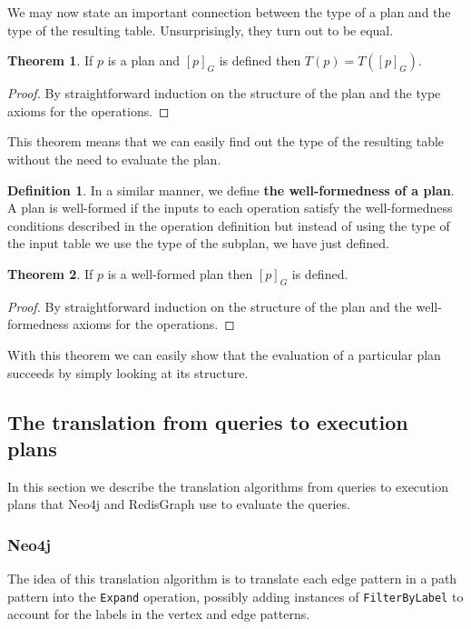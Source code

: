 \documentclass[14pt]{constructor-thesis}
\theoremstyle{definition}
\newtheorem{theorem}{Theorem}
\newtheorem{definition}{Definition}
\begin{document}
We may now state an important connection between the type of a plan and the type of the resulting table. Unsurprisingly, they turn out to be equal.

\begin{theorem}
  If $p$ is a plan and $[p]_G$ is defined then $T(p) = T([p]_G)$.
\end{theorem}
\begin{proof}
  By straightforward induction on the structure of the plan and the type axioms for the operations.
\end{proof}

This theorem means that we can easily find out the type of the resulting table without the need to evaluate the plan.

\begin{definition}
  In a similar manner, we define \textbf{the well-formedness of a plan}. A plan is well-formed if the inputs to each operation satisfy the well-formedness conditions described in the operation definition but instead of using the type of the input table we use the type of the subplan, we have just defined.
\end{definition}

\begin{theorem}
  If $p$ is a well-formed plan then $[p]_G$ is defined.
\end{theorem}
\begin{proof}
  By straightforward induction on the structure of the plan and the well-formedness axioms for the operations.
\end{proof}

With this theorem we can easily show that the evaluation of a particular plan succeeds by simply looking at its structure.

\subsection{The translation from queries to execution plans}

In this section we describe the translation algorithms from queries to execution plans that Neo4j and RedisGraph use to evaluate the queries.

\subsubsection{Neo4j}

The idea of this translation algorithm is to translate each edge pattern in a path pattern into the \texttt{Expand} operation, possibly adding instances of \texttt{FilterByLabel} to account for the labels in the vertex and edge patterns.
\end{document}
